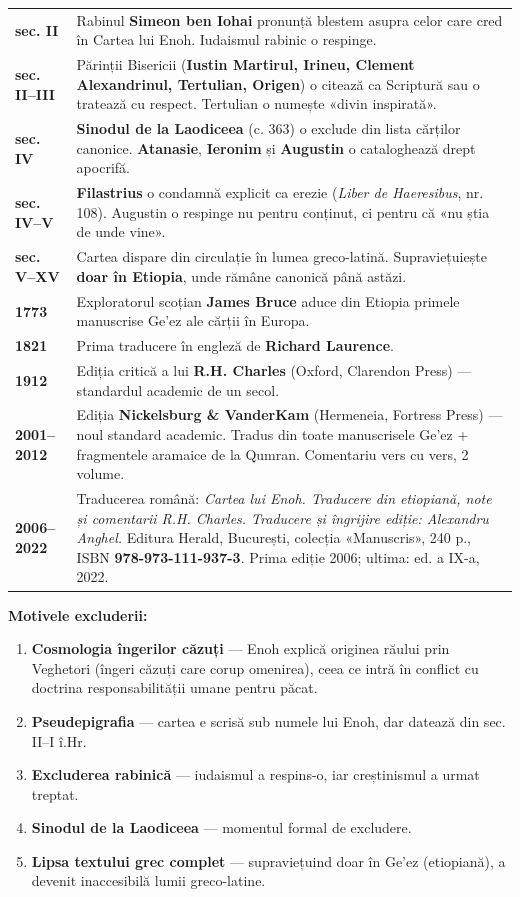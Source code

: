 \documentclass[12pt,a4paper,twoside,openany]{book}
\begin{document}
\begin{longtable}{L{4.9cm}L{10.1cm}}
\textbf{sec. II} & Rabinul \textbf{Simeon ben Iohai} pronunță blestem asupra celor care cred în Cartea lui Enoh. Iudaismul rabinic o respinge. \\
\textbf{sec. II–III} & Părinții Bisericii (\textbf{Iustin Martirul, Irineu, Clement Alexandrinul, Tertulian, Origen}) o citează ca Scriptură sau o tratează cu respect. Tertulian o numește «divin inspirată». \\
\textbf{sec. IV} & \textbf{Sinodul de la Laodiceea} (c. 363) o exclude din lista cărților canonice. \textbf{Atanasie}, \textbf{Ieronim} și \textbf{Augustin} o cataloghează drept apocrifă. \\
\textbf{sec. IV–V} & \textbf{Filastrius} o condamnă explicit ca erezie (\textit{Liber de Haeresibus}, nr. 108). Augustin o respinge nu pentru conținut, ci pentru că «nu știa de unde vine». \\
\textbf{sec. V–XV} & Cartea dispare din circulație în lumea greco-latină. Supraviețuiește \textbf{doar în Etiopia}, unde rămâne canonică până astăzi. \\
\textbf{1773} & Exploratorul scoțian \textbf{James Bruce} aduce din Etiopia primele manuscrise Ge’ez ale cărții în Europa. \\
\textbf{1821} & Prima traducere în engleză de \textbf{Richard Laurence}. \\
\textbf{1912} & Ediția critică a lui \textbf{R.H. Charles} (Oxford, Clarendon Press) — standardul academic de un secol. \\
\textbf{2001–2012} & Ediția \textbf{Nickelsburg \& VanderKam} (Hermeneia, Fortress Press) — noul standard academic. Tradus din toate manuscrisele Ge’ez + fragmentele aramaice de la Qumran. Comentariu vers cu vers, 2 volume. \\
\textbf{2006–2022} & Traducerea română: \textit{Cartea lui Enoh. Traducere din etiopiană, note și comentarii R.H. Charles. Traducere și îngrijire ediție: Alexandru Anghel.} Editura Herald, București, colecția «Manuscris», 240 p., ISBN \textbf{978-973-111-937-3}. Prima ediție 2006; ultima: ed. a IX-a, 2022. \\
\bottomrule
\end{longtable}
\normalsize
\textbf{Motivele excluderii:}

\begin{enumerate}
  \item \textbf{Cosmologia îngerilor căzuți} — Enoh explică originea răului prin Veghetori (îngeri căzuți care corup omenirea), ceea ce intră în conflict cu doctrina responsabilității umane pentru păcat.
  \item \textbf{Pseudepigrafia} — cartea e scrisă sub numele lui Enoh, dar datează din sec. II–I î.Hr.
  \item \textbf{Excluderea rabinică} — iudaismul a respins-o, iar creștinismul a urmat treptat.
  \item \textbf{Sinodul de la Laodiceea} — momentul formal de excludere.
  \item \textbf{Lipsa textului grec complet} — supraviețuind doar în Ge’ez (etiopiană), a devenit inaccesibilă lumii greco-latine.
\end{enumerate}
\end{document}

